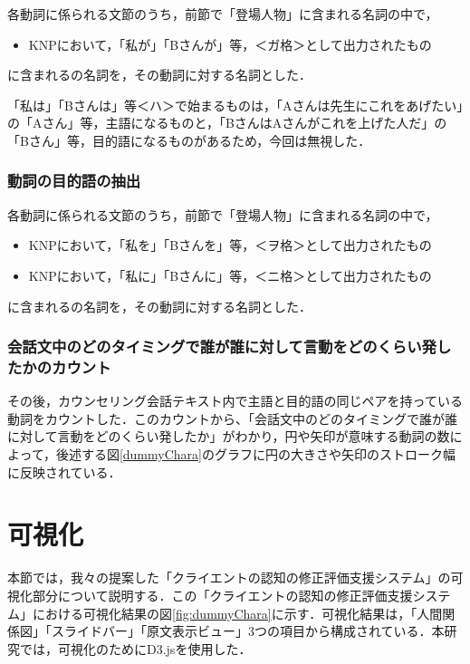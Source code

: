 \documentclass[shuuron]{kuee}
\begin{document}
各動詞に係られる文節のうち，前節で「登場人物」に含まれる名詞の中で，

\begin{itemize}

  \item KNPにおいて，「私が」「Bさんが」等，＜ガ格＞として出力されたもの
\end{itemize}
に含まれるの名詞を，その動詞に対する名詞とした．

「私は」「Bさんは」等＜ハ＞で始まるものは，「Aさんは先生にこれをあげたい」の「Aさん」等，主語になるものと，「BさんはAさんがこれを上げた人だ」の「Bさん」等，目的語になるものがあるため，今回は無視した．

\subsubsection{動詞の目的語の抽出}


各動詞に係られる文節のうち，前節で「登場人物」に含まれる名詞の中で，

\begin{itemize}

  \item KNPにおいて，「私を」「Bさんを」等，＜ヲ格＞として出力されたもの
  \item KNPにおいて，「私に」「Bさんに」等，＜ニ格＞として出力されたもの
\end{itemize}
に含まれるの名詞を，その動詞に対する名詞とした．

\subsubsection{会話文中のどのタイミングで誰が誰に対して言動をどのくらい発したかのカウント}

その後，カウンセリング会話テキスト内で主語と目的語の同じペアを持っている動詞をカウントした．このカウントから、「会話文中のどのタイミングで誰が誰に対して言動をどのくらい発したか」がわかり，円や矢印が意味する動詞の数によって，後述する図\ref{dummyChara}のグラフに円の大きさや矢印のストローク幅に反映されている．


\section{可視化}

本節では，我々の提案した「クライエントの認知の修正評価支援システム」の可視化部分について説明する．この「クライエントの認知の修正評価支援システム」における可視化結果の図\ref{fig:dummyChara}に示す．可視化結果は，「人間関係図」「スライドバー」「原文表示ビュー」3つの項目から構成されている．本研究では，可視化のためにD3.js\cite{vand3}を使用した．%
\end{document}
